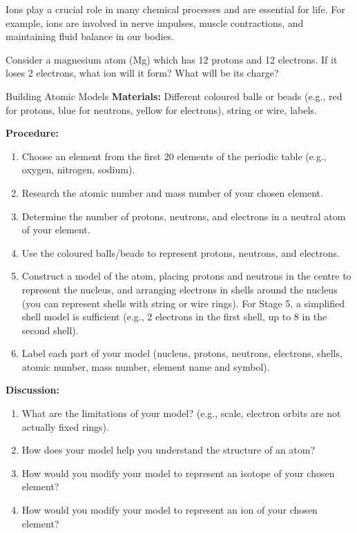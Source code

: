 Ions play a crucial role in many chemical processes and are essential for life.  For example, ions are involved in nerve impulses, muscle contractions, and maintaining fluid balance in our bodies.

\begin{stopandthink}
Consider a magnesium atom (Mg) which has 12 protons and 12 electrons. If it loses 2 electrons, what ion will it form? What will be its charge?
\end{stopandthink}

\begin{investigation}{Building Atomic Models}
\textbf{Materials:}  Different coloured balls or beads (e.g., red for protons, blue for neutrons, yellow for electrons), string or wire, labels.

\textbf{Procedure:}
\begin{enumerate}
    \item Choose an element from the first 20 elements of the periodic table (e.g., oxygen, nitrogen, sodium).
    \item Research the atomic number and mass number of your chosen element.
    \item Determine the number of protons, neutrons, and electrons in a neutral atom of your element.
    \item Use the coloured balls/beads to represent protons, neutrons, and electrons.
    \item Construct a model of the atom, placing protons and neutrons in the centre to represent the nucleus, and arranging electrons in shells around the nucleus (you can represent shells with string or wire rings).  For Stage 5, a simplified shell model is sufficient (e.g., 2 electrons in the first shell, up to 8 in the second shell).
    \item Label each part of your model (nucleus, protons, neutrons, electrons, shells, atomic number, mass number, element name and symbol).
\end{enumerate}

\textbf{Discussion:}
\begin{enumerate}
    \item What are the limitations of your model? (e.g., scale, electron orbits are not actually fixed rings).
    \item How does your model help you understand the structure of an atom?
    \item How would you modify your model to represent an isotope of your chosen element?
    \item How would you modify your model to represent an ion of your chosen element?
\end{enumerate}
\end{investigation}

